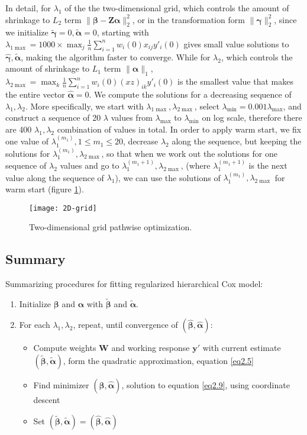 In detail, for $\lambda_1$ of the the two-dimensional grid, which controls the amount of shrinkage to $L_2$ term $\|\bm{\beta}-\bm{Z\alpha}\|_2^2$, or in the transformation form $\|\bm{\gamma}\|_2^2$, since we initialize $\tilde{\bm{\gamma}}=0, \tilde{\bm{\alpha}}=0$, starting with $\lambda_{1\max}=1000\times \max_j\frac{1}{n}\sum_{i=1}^nw_i(0)x_{ij}y'_i(0)$ gives small value solutions to $\hat{\bm{\gamma}},\tilde{\bm{\alpha}}$, making the algorithm faster to converge. While for $\lambda_2$, which controls the amount of shrinkage to $L_1$ term $\|\bm{\alpha}\|_1$, $\lambda_{2\max}=\max_k \frac{1}{n}\sum_{i=1}^n w_i(0)(xz)_{ik}y'_i(0)$ is the smallest value that makes the entire vector $\hat{\bm{\alpha}}=0$. We compute the solutions for a decreasing sequence of $\lambda_1,\lambda_2$. More specifically, we start with $\lambda_{1\max},\lambda_{2\max}$, select $\lambda_{\min}=0.001\lambda_{\max}$, and construct a sequence of 20 $\lambda$ values from $
\lambda_{\max}$ to $\lambda_{\min}$ on log scale, therefore there are 400 $\lambda_1,\lambda_2$ combination of values in total. In order to apply warm start, we fix one value of $\lambda_1^{(m_1)}, 1\leq m_1\leq 20$, decrease $\lambda_2$ along the sequence, but keeping the solutions for $\lambda_{1}^{(m_1)}, \lambda_{2\max}$, so that when we work out the solutions for one sequence of $\lambda_2$ values and go to $\lambda_{1}^{(m_1+1)}, \lambda_{2\max}$, (where $\lambda_{1}^{(m_1+1)}$ is the next value along the sequence of $\lambda_1$), we can use the solutions of $\lambda_{1}^{(m_1)}, \lambda_{2\max}$ for warm start (figure \ref{fig:2d}).
\begin{figure}[tbh]
  \centering
  \texttt{[image: 2D-grid]}
  \caption[Two-dimensional grid pathwise optimization]{
    Two-dimensional grid pathwise optimization.
  }
  \label{fig:2d}
\end{figure}

\subsection{Summary}
Summarizing procedures for fitting regularized hierarchical Cox model: 
\begin{enumerate}
    \item Initialize $\bm{\beta}$ and $\bm{\alpha}$ with $\widetilde{\bm{\beta}}$ and $\widetilde{\bm{\alpha}}$.
    \item For each $\lambda_1, \lambda_2$, repeat, until convergence of $(\hat{\bm{\beta}},\hat{\bm{\alpha}})$: 
    \begin{itemize}
        \item Compute weights $\bm{W}$ and working response $\bm{y}'$ with current estimate $(\tilde{\bm{\beta}},\tilde{\bm{\alpha}})$, form the quadratic approximation, equation \eqref{eq2.5}
        \item Find minimizer $(\hat{\bm{\beta}},\hat{\bm{\alpha}})$, solution to equation \eqref{eq2.9}, using coordinate descent
        \item Set $(\tilde{\bm{\beta}},\tilde{\bm{\alpha}})=(\hat{\bm{\beta}},\hat{\bm{\alpha}})$
    \end{itemize}
\end{enumerate}

